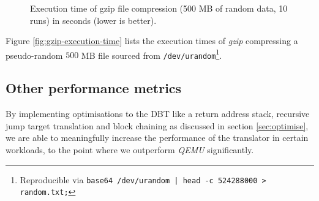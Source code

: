 \begin{figure}[h]
	\centering
	\caption[Execution time of gzip compression (500 MB, 10 runs)]%
	{Execution time of gzip file compression (500 MB of random data, 10 runs) in seconds (lower is better).}
	\label{fig:gzip-execution-time}
\end{figure}

Figure \vref{fig:gzip-execution-time} lists the execution times of \textit{gzip} compressing a pseudo-random $500$ MB file sourced from \texttt{/dev/urandom}\footnote{Reproducible via \texttt{base64 /dev/urandom | head -c 524288000 > random.txt;}}.

\subsection{Other performance metrics}
By implementing optimisations to the DBT like a return address stack, recursive jump target translation and block chaining as discussed in section \vref{sec:optimise}, we are able to meaningfully increase the performance of the translator in certain workloads, to the point where we outperform \textit{QEMU} significantly.

